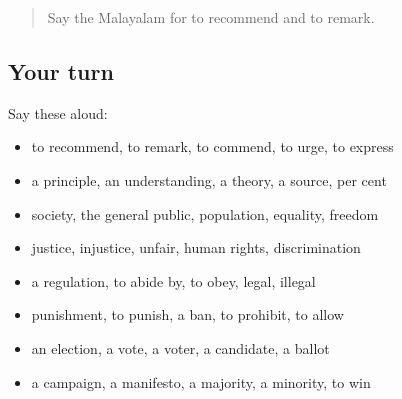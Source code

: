 \label{lesson:ML-R420-review-413-420}



\begin{quote}
Say the Malayalam for to recommend and to remark.
\end{quote}

\subsection*{Your turn}
Say these aloud:

\begin{itemize}
\raggedright
  \item to recommend, to remark, to commend, to urge, to express
  \item a principle, an understanding, a theory, a source, per cent
  \item society, the general public, population, equality, freedom
  \item justice, injustice, unfair, human rights, discrimination
  \item a regulation, to abide by, to obey, legal, illegal
  \item punishment, to punish, a ban, to prohibit, to allow
  \item an election, a vote, a voter, a candidate, a ballot
  \item a campaign, a manifesto, a majority, a minority, to win
\end{itemize}


